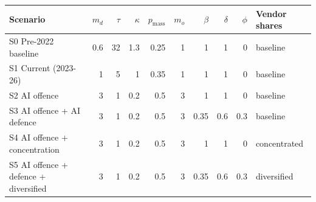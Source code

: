 \begin{tabular}{lrrrrrrrrl}
\toprule
Scenario & $m_d$ & $\tau$ & $\kappa$ & $p_{\text{mass}}$ & $m_o$ & $\beta$ & $\delta$ & $\phi$ & Vendor shares \\
\midrule
S0 Pre-2022 baseline & 0.6 & 32 & 1.3 & 0.25 & 1 & 1 & 1 & 0 & baseline \\
S1 Current (2023-26) & 1 & 5 & 1 & 0.35 & 1 & 1 & 1 & 0 & baseline \\
S2 AI offence & 3 & 1 & 0.2 & 0.5 & 3 & 1 & 1 & 0 & baseline \\
S3 AI offence + AI defence & 3 & 1 & 0.2 & 0.5 & 3 & 0.35 & 0.6 & 0.3 & baseline \\
S4 AI offence + concentration & 3 & 1 & 0.2 & 0.5 & 3 & 1 & 1 & 0 & concentrated \\
S5 AI offence + defence + diversified & 3 & 1 & 0.2 & 0.5 & 3 & 0.35 & 0.6 & 0.3 & diversified \\
\bottomrule
\end{tabular}